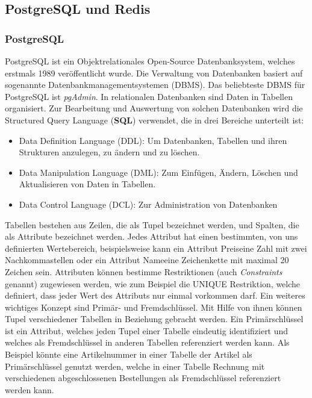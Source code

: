 \documentclass[a4paper,12pt]{report}
\newcommand{\footcite}[1]{\footnotemark\footnotetext{\cite{#1}}}
\begin{document}
        \subsection{PostgreSQL und Redis}
        \subsubsection{PostgreSQL}
PostgreSQL ist ein Objektrelationales Open-Source Datenbanksystem, welches erstmals 1989 veröffentlicht wurde\footcite{postgresql-book}. Die Verwaltung von Datenbanken basiert auf sogenannte Datenbankmanagementsystemen (DBMS). Das beliebteste DBMS für PostgreSQL ist \textit{pgAdmin}\footcite{pgAdmin}.  In relationalen Datenbanken sind Daten in Tabellen organisiert. Zur Bearbeitung und Auswertung von solchen Datenbanken wird die Structured Query Language (\textbf{SQL}) verwendet, die in drei Bereiche unterteilt ist\footcite{sql-book}:
\begin{itemize}
 \item Data Definition Language (DDL): Um Datenbanken, Tabellen und ihren Strukturen anzulegen, zu ändern und zu löschen.
 \item  Data Manipulation Language (DML): Zum Einfügen, Ändern, Löschen und Aktualisieren von Daten in Tabellen.
 \item Data Control Language (DCL): Zur Administration von Datenbanken
\end{itemize}

Tabellen bestehen aus Zeilen, die als Tupel bezeichnet werden, und Spalten, die als Attribute bezeichnet werden. Jedes Attribut hat einen bestimmten, von uns definierten Wertebereich, beispielsweise kann ein Attribut \glqq Preis\grqq{ }eine Zahl mit zwei Nachkommastellen oder ein Attribut \glqq Name\grqq{ }eine Zeichenkette mit maximal 20 Zeichen sein.  Attributen können bestimme Restriktionen (auch \textit{Constraints} genannt) zugewiesen werden, wie zum Beispiel die UNIQUE Restriktion, welche definiert, dass jeder Wert des Attributs nur einmal vorkommen darf.
Ein weiteres wichtiges Konzept sind Primär- und Fremdschlüssel. Mit Hilfe von ihnen können Tupel verschiedener Tabellen in Beziehung gebracht werden. Ein Primärschlüssel ist ein Attribut, welches jeden Tupel einer Tabelle eindeutig identifiziert und welches als Fremdschlüssel in anderen Tabellen referenziert werden kann. Als Beispiel könnte eine Artikelnummer in einer Tabelle der Artikel als Primärschlüssel genutzt werden, welche in einer Tabelle Rechnung mit verschiedenen abgeschlossenen Bestellungen als Fremdschlüssel referenziert werden kann.
\end{document}
